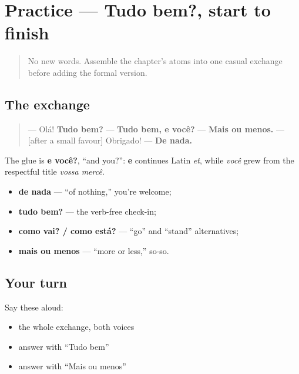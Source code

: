 \section[Practice]{Practice — Tudo bem?, start to finish}

\label{lesson:PT-C02-practice}



\begin{quote}
No new words. Assemble the chapter’s atoms into one casual exchange before adding the formal version.
\end{quote}

\subsection*{The exchange}
\begin{quote}
— Olá! \textbf{Tudo bem?} — \textbf{Tudo bem, e você?} — \textbf{Mais ou menos.} — {[}after a small favour{]} Obrigado! — \textbf{De nada.}
\end{quote}

The glue is \textbf{e você?}, “and you?”: \textbf{e} continues Latin \emph{et}, while \emph{você} grew from the respectful title \emph{vossa mercê}.

\begin{grammarlens}[title={What you've built: What you are retrieving}]
\begin{itemize}
\raggedright
  \item \textbf{de nada} — “of nothing,” you’re welcome;
  \item \textbf{tudo bem?} — the verb-free check-in;
  \item \textbf{como vai? / como está?} — “go” and “stand” alternatives;
  \item \textbf{mais ou menos} — “more or less,” so-so.
\end{itemize}
\end{grammarlens}

\subsection*{Your turn}
Say these aloud:

\begin{itemize}
\raggedright
  \item the whole exchange, both voices
  \item answer with “Tudo bem”
  \item answer with “Mais ou menos”
\end{itemize}

